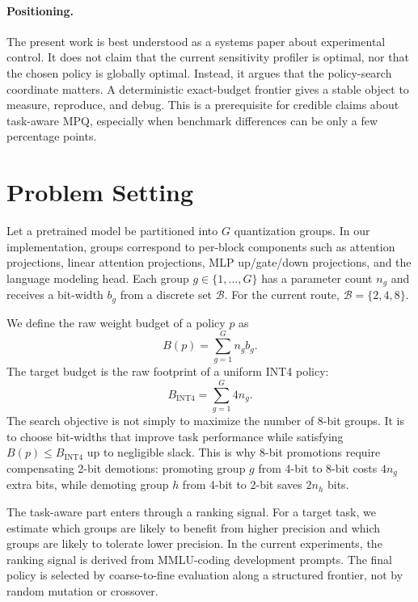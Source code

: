 \documentclass{article}
\begin{document}
\paragraph{Positioning.}
The present work is best understood as a systems paper about experimental control. It does not claim that the current sensitivity profiler is optimal, nor that the chosen policy is globally optimal. Instead, it argues that the policy-search coordinate matters. A deterministic exact-budget frontier gives a stable object to measure, reproduce, and debug. This is a prerequisite for credible claims about task-aware MPQ, especially when benchmark differences can be only a few percentage points.

\section{Problem Setting}

Let a pretrained model be partitioned into $G$ quantization groups. In our implementation, groups correspond to per-block components such as attention projections, linear attention projections, MLP up/gate/down projections, and the language modeling head. Each group $g \in \{1,\dots,G\}$ has a parameter count $n_g$ and receives a bit-width $b_g$ from a discrete set $\mathcal{B}$. For the current route, $\mathcal{B}=\{2,4,8\}$.

We define the raw weight budget of a policy $p$ as
\begin{equation}
B(p) = \sum_{g=1}^{G} n_g b_g.
\end{equation}
The target budget is the raw footprint of a uniform INT4 policy:
\begin{equation}
B_{\text{INT4}} = \sum_{g=1}^{G} 4n_g.
\end{equation}
The search objective is not simply to maximize the number of 8-bit groups. It is to choose bit-widths that improve task performance while satisfying $B(p) \le B_{\text{INT4}}$ up to negligible slack. This is why 8-bit promotions require compensating 2-bit demotions: promoting group $g$ from 4-bit to 8-bit costs $4n_g$ extra bits, while demoting group $h$ from 4-bit to 2-bit saves $2n_h$ bits.

The task-aware part enters through a ranking signal. For a target task, we estimate which groups are likely to benefit from higher precision and which groups are likely to tolerate lower precision. In the current experiments, the ranking signal is derived from MMLU-coding development prompts. The final policy is selected by coarse-to-fine evaluation along a structured frontier, not by random mutation or crossover.
\end{document}

